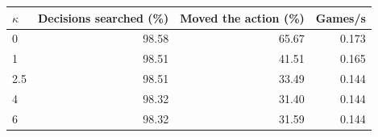 \begin{tabular}{lrrr}
\toprule
$\kappa$ & Decisions searched (\%) & Moved the action (\%) & Games/s \\
\midrule
0 & 98.58 & 65.67 & 0.173 \\
1 & 98.51 & 41.51 & 0.165 \\
2.5 & 98.51 & 33.49 & 0.144 \\
4 & 98.32 & 31.40 & 0.144 \\
6 & 98.32 & 31.59 & 0.144 \\
\bottomrule
\end{tabular}
